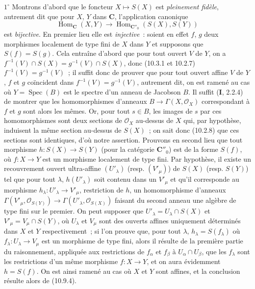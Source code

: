 $1^\circ$ Montrons d'abord que le foncteur $X\mapsto S(X)$ est
\emph{pleinement fidèle}, autrement dit que pour $X$, $Y$ dans $\mathbf C$,
l'application canonique
\[
  \operatorname{Hom}_{\mathbf C}(X,Y)\longrightarrow
  \operatorname{Hom}_{\mathbf C''_0}(S(X),S(Y))
\]
est \emph{bijective}. En premier lieu elle est \emph{injective}~: soient en
effet $f$, $g$ deux morphismes localement de type fini de $X$ dans $Y$ et
supposons que $S(f)=S(g)$. Cela entraîne d'abord que pour tout ouvert $V$ de
$Y$, on a
$f^{-1}(V)\cap S(X)=g^{-1}(V)\cap S(X)$, donc (10.3.1 et 10.2.7)
$f^{-1}(V)=g^{-1}(V)$~; il suffit donc de prouver que pour tout ouvert affine
$V$ de $Y$, $f$ et $g$ coïncident dans
$f^{-1}(V)=g^{-1}(V)$, autrement dit, on est ramené au cas où
$Y=\operatorname{Spec}(B)$ est le spectre d'un anneau de Jacobson $B$. Il
suffit (\textbf I, 2.2.4) de montrer que les homomorphismes d'anneaux
$B\to\Gamma(X,\mathcal O_X)$ correspondant à $f$ et $g$ sont alors les mêmes.
Or, pour tout $s\in B$, les images de $s$ par ces homomorphismes sont deux
sections de $\mathcal O_X$ au-dessus de $X$ qui, par hypothèse, induisent la
même section au-dessus de $S(X)$~; on sait donc (10.2.8) que ces sections sont
identiques, d'où notre assertion. Prouvons en second lieu que tout morphisme
$h:S(X)\to S(Y)$ (pour la catégorie $\mathbf C''_0$) est de la forme $S(f)$,
où $f:X\to Y$ est un morphisme localement de type fini. Par hypothèse, il
existe un recouvrement ouvert ultra-affine $(U'_\lambda)$ (resp.
$(V'_\mu)$) de $S(X)$ (resp. $S(Y)$) tel que pour tout $\lambda$,
$h(U'_\lambda)$ soit contenu dans un $V'_\mu$ et qu'il corresponde au
morphisme $h_\lambda:U'_\lambda\to V'_\mu$, restriction de $h$, un
homomorphisme d'anneaux
$\Gamma(V'_\mu,\mathcal O_{S(Y)})\to
\Gamma(U'_\lambda,\mathcal O_{S(X)})$ faisant du second anneau une algèbre de
type fini sur le premier. On peut supposer que
$U'_\lambda=U_\lambda\cap S(X)$ et $V'_\mu=V_\mu\cap S(Y)$, où
$U_\lambda$ et $V_\mu$ sont des ouverts affines uniquement déterminés dans
$X$ et $Y$ respectivement~; si l'on prouve que, pour tout $\lambda$,
$h_\lambda=S(f_\lambda)$ où $f_\lambda:U_\lambda\to V_\mu$ est un morphisme
de type fini, alors il résulte de la première partie du raisonnement,
appliquée aux restrictions de $f_\alpha$ et $f_\beta$ à
$U_\alpha\cap U_\beta$, que les $f_\lambda$ sont les restrictions d'un même
morphisme $f:X\to Y$, et on aura évidemment $h=S(f)$. On est ainsi ramené au
cas où $X$ et $Y$ sont affines, et la conclusion résulte alors de (10.9.4).

